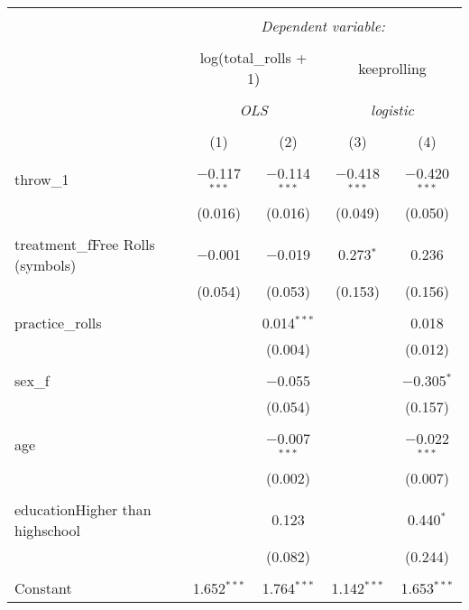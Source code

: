 
\begin{table}[!htbp] \centering 
  \caption{} 
  \label{} 
\begin{tabular}{@{\extracolsep{5pt}}lcccc} 
\\[-1.8ex]\hline 
\hline \\[-1.8ex] 
 & \multicolumn{4}{c}{\textit{Dependent variable:}} \\ 
\cline{2-5} 
\\[-1.8ex] & \multicolumn{2}{c}{log(total\_rolls + 1)} & \multicolumn{2}{c}{keeprolling} \\ 
\\[-1.8ex] & \multicolumn{2}{c}{\textit{OLS}} & \multicolumn{2}{c}{\textit{logistic}} \\ 
\\[-1.8ex] & (1) & (2) & (3) & (4)\\ 
\hline \\[-1.8ex] 
 throw\_1 & $-$0.117$^{***}$ & $-$0.114$^{***}$ & $-$0.418$^{***}$ & $-$0.420$^{***}$ \\ 
  & (0.016) & (0.016) & (0.049) & (0.050) \\ 
  & & & & \\ 
 treatment\_fFree Rolls (symbols) & $-$0.001 & $-$0.019 & 0.273$^{*}$ & 0.236 \\ 
  & (0.054) & (0.053) & (0.153) & (0.156) \\ 
  & & & & \\ 
 practice\_rolls &  & 0.014$^{***}$ &  & 0.018 \\ 
  &  & (0.004) &  & (0.012) \\ 
  & & & & \\ 
 sex\_f &  & $-$0.055 &  & $-$0.305$^{*}$ \\ 
  &  & (0.054) &  & (0.157) \\ 
  & & & & \\ 
 age &  & $-$0.007$^{***}$ &  & $-$0.022$^{***}$ \\ 
  &  & (0.002) &  & (0.007) \\ 
  & & & & \\ 
 educationHigher than highschool &  & 0.123 &  & 0.440$^{*}$ \\ 
  &  & (0.082) &  & (0.244) \\ 
  & & & & \\ 
 Constant & 1.652$^{***}$ & 1.764$^{***}$ & 1.142$^{***}$ & 1.653$^{***}$ \\ 

\end{tabular}
\end{table}
